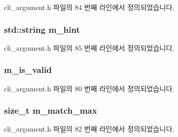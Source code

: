 cli\+\_\+argument.\+h 파일의 84 번째 라인에서 정의되었습니다.

\subsubsection[{\texorpdfstring{m\+\_\+hint}{m_hint}}]{\setlength{\rightskip}{0pt plus 5cm}std\+::string m\+\_\+hint\hspace{0.3cm}{\ttfamily [protected]}}\hypertarget{classcli__argument_a3feeeba99be6bb94b8fa0ebc88ef09cf}{}\label{classcli__argument_a3feeeba99be6bb94b8fa0ebc88ef09cf}


cli\+\_\+argument.\+h 파일의 85 번째 라인에서 정의되었습니다.

\subsubsection[{\texorpdfstring{m\+\_\+is\+\_\+valid}{m_is_valid}}]{ m\+\_\+is\+\_\+valid\hspace{0.3cm}{\ttfamily [protected]}}\hypertarget{classcli__argument_a3163252d457c8ef3a286a8538d7e319f}{}\label{classcli__argument_a3163252d457c8ef3a286a8538d7e319f}


cli\+\_\+argument.\+h 파일의 80 번째 라인에서 정의되었습니다.

\subsubsection[{\texorpdfstring{m\+\_\+match\+\_\+max}{m_match_max}}]{\setlength{\rightskip}{0pt plus 5cm}size\+\_\+t m\+\_\+match\+\_\+max\hspace{0.3cm}{\ttfamily [protected]}}\hypertarget{classcli__argument_a6f9fd009acee86b73a9f1b8e80a95b43}{}\label{classcli__argument_a6f9fd009acee86b73a9f1b8e80a95b43}


cli\+\_\+argument.\+h 파일의 82 번째 라인에서 정의되었습니다.

